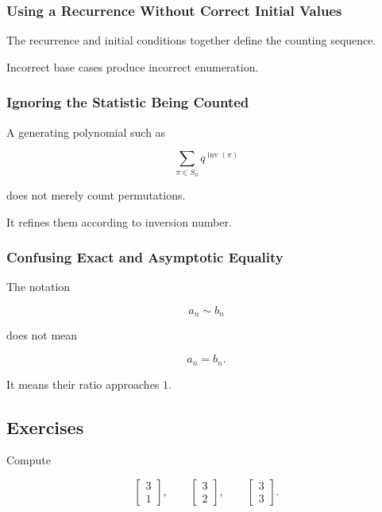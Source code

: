 \subsubsection{Using a Recurrence Without Correct Initial Values}

The recurrence and initial conditions together define the counting
sequence.

Incorrect base cases produce incorrect enumeration.

\subsubsection{Ignoring the Statistic Being Counted}

A generating polynomial such as

\[
\sum_{\pi\in S_n}
q^{\operatorname{inv}(\pi)}
\]

does not merely count permutations.

It refines them according to inversion number.

\subsubsection{Confusing Exact and Asymptotic Equality}

The notation

\[
a_n\sim b_n
\]

does not mean

\[
a_n=b_n.
\]

It means their ratio approaches \(1\).

\subsection{Exercises}
\label{subsec:enumerative-combinatorics-exercises}

\begin{exercise}[1]
Compute

\[
\left[
\begin{matrix}
3\\
1
\end{matrix}
\right],
\qquad
\left[
\begin{matrix}
3\\
2
\end{matrix}
\right],
\qquad
\left[
\begin{matrix}
3\\
3
\end{matrix}
\right].
\]
\end{exercise}

